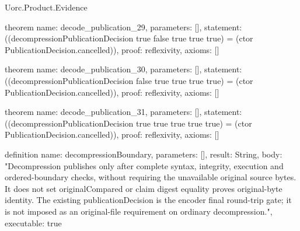 \begin{lexlean}{Uorc.Product.Evidence}
\begin{semanticmodule}
theorem{
  name: decode_publication_29,
  parameters: [],
  statement: ((decompressionPublicationDecision true false true true true) = (ctor PublicationDecision.cancelled)),
  proof: reflexivity{},
  axioms: []
}

theorem{
  name: decode_publication_30,
  parameters: [],
  statement: ((decompressionPublicationDecision false true true true true) = (ctor PublicationDecision.cancelled)),
  proof: reflexivity{},
  axioms: []
}

theorem{
  name: decode_publication_31,
  parameters: [],
  statement: ((decompressionPublicationDecision true true true true true) = (ctor PublicationDecision.cancelled)),
  proof: reflexivity{},
  axioms: []
}

definition{
  name: decompressionBoundary,
  parameters: [],
  result: String,
  body: "Decompression publishes only after complete syntax, integrity, execution and ordered-boundary checks, without requiring the unavailable original source bytes. It does not set originalCompared or claim digest equality proves original-byte identity. The existing publicationDecision is the encoder final round-trip gate; it is not imposed as an original-file requirement on ordinary decompression.",
  executable: true
}
\end{semanticmodule}
\end{lexlean}
